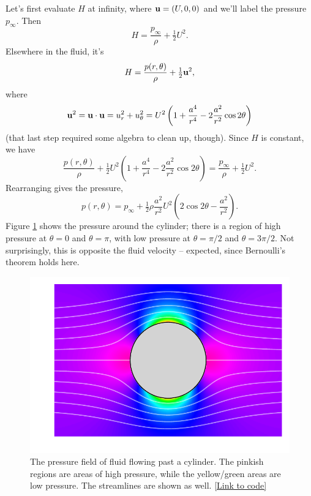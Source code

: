 Let's first evaluate $H$ at infinity, where $\mathbf{u} = (U,0,0)$ and we'll label the pressure $p_\infty$.  Then
\[
H = \frac{p_\infty}{\rho} + \tfrac{1}{2} U^2.
\]
Elsewhere in the fluid, it's
\[
H = \frac{p(r, \theta)}{\rho} + \tfrac{1}{2} \mathbf{u}^2,
\]
where
\[
\mathbf{u}^2 = \mathbf{u} \cdot \mathbf{u} = u_r^2 + u_\theta^2 = U^2 \left( 1 + \frac{a^4}{r^4} - 2\frac{a^2}{r^2} \cos 2\theta \right)
\]
(that last step required some algebra to clean up, though).  Since $H$ is constant, we have
\[
\frac{p(r, \theta)}{\rho} + \tfrac{1}{2} U^2 \left( 1 + \frac{a^4}{r^4} - 2\frac{a^2}{r^2} \cos 2\theta \right) = \frac{p_\infty}{\rho} + \tfrac{1}{2} U^2.
\]
Rearranging gives the pressure,
\begin{equation}
p(r, \theta) = p_\infty + \tfrac{1}{2} \rho \frac{a^2}{r^2} U^2 \left( 2 \cos 2\theta - \frac{a^2}{r^2} \right).
\end{equation}
Figure \ref{fig_cyl_pressure} shows the pressure around the cylinder; there is a region of high pressure at $\theta = 0$ and $\theta = \pi$, with low pressure at $\theta = \pi/2$ and $\theta = 3\pi/2$.  Not surprisingly, this is opposite the fluid velocity -- expected, since Bernoulli's theorem holds here.

\begin{figure}[t]
\centering\includegraphics[width=0.8\linewidth]{Figures/Chapter3/fig_cylinder_pressure}
\caption{The pressure field of fluid flowing past a cylinder.  The pinkish regions are areas of high pressure, while the yellow/green areas are low pressure.  The streamlines are shown as well. \href{https://nbviewer.jupyter.org/github/josephmacmillan/IntroFluidDynamics/blob/master/Jupyter/3-IdealFluids.ipynb\#Figure-3.6:-Pressure}{[Link to code]}}
\label{fig_cyl_pressure}
\end{figure}








